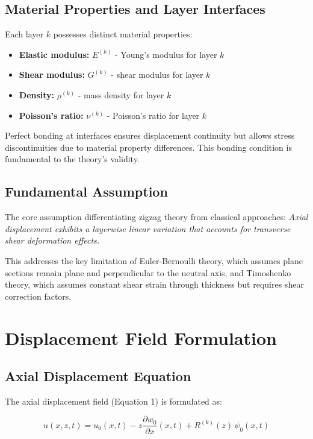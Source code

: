 \documentclass[12pt,a4paper]{article}
\begin{document}
\subsection{Material Properties and Layer Interfaces}

Each layer $k$ possesses distinct material properties:
\begin{itemize}
\item \textbf{Elastic modulus:} $E^{(k)}$ - Young's modulus for layer $k$
\item \textbf{Shear modulus:} $G^{(k)}$ - shear modulus for layer $k$
\item \textbf{Density:} $\rho^{(k)}$ - mass density for layer $k$
\item \textbf{Poisson's ratio:} $\nu^{(k)}$ - Poisson's ratio for layer $k$
\end{itemize}

Perfect bonding at interfaces ensures displacement continuity but allows stress discontinuities due to material property differences. This bonding condition is fundamental to the theory's validity.

\subsection{Fundamental Assumption}

The core assumption differentiating zigzag theory from classical approaches: \textit{Axial displacement exhibits a layerwise linear variation that accounts for transverse shear deformation effects.}

This addresses the key limitation of Euler-Bernoulli theory, which assumes plane sections remain plane and perpendicular to the neutral axis, and Timoshenko theory, which assumes constant shear strain through thickness but requires shear correction factors.

\section{Displacement Field Formulation}

\subsection{Axial Displacement Equation}

The axial displacement field (Equation 1) is formulated as:

\begin{equation}
    u(x,z,t) = u_0(x,t) - z \frac{\partial w_0}{\partial x}(x,t) + R^{(k)}(z) \, \psi_0(x,t)
    \label{eq:axial_displacement}
\end{equation}
\end{document}
